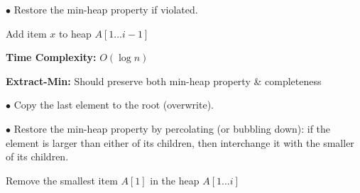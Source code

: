\documentclass[10pt]{article}
\begin{document}
$\bullet$ Restore the min-heap property if violated.
\begin{algorithm}
	\SetAlgoLined
	
	\caption{Add item $x$ to heap $A[1 \dots i-1]$}
\end{algorithm}

\textbf{Time Complexity:} $O(\log n)$

\newpage

\textbf{Extract-Min:} Should preserve both min-heap property \& completeness

$\bullet$ Copy the last element to the root (overwrite).

$\bullet$ Restore the min-heap property by percolating (or bubbling 
down): if the element is larger than either of its children, then
interchange it with the smaller of its children.
\begin{algorithm}
	\SetAlgoLined
	
	\caption{Remove the smallest item $A[1]$ in the heap $A[1 \dots i]$}
\end{algorithm}
\end{document}
